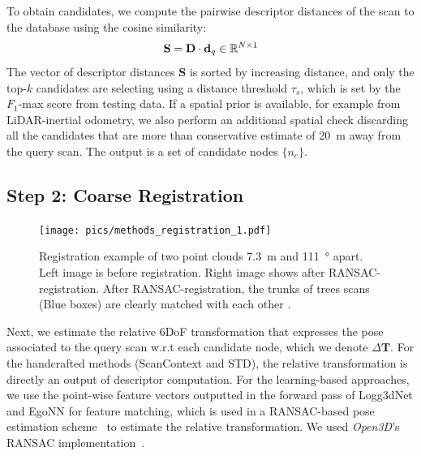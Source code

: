 To obtain candidates, we compute the pairwise descriptor distances of the scan to the database using the cosine similarity:
\begin{equation}
  \mathbf{S} = \mathbf{D} \cdot \mathbf{d}_{q} \in \mathbb{R}^{N \times 1}
\end{equation}
The vector of descriptor distances $\mathbf{S}$ is sorted by increasing distance, and only the top-$k$ candidates are selecting using a distance threshold $\tau_{s}$, which is set by the $F_1$-max score from testing data.
If a spatial prior is available, for example from LiDAR-inertial odometry, we also perform an additional spatial check discarding all the candidates that are more than conservative estimate of \SI{20}{\meter} away from the query scan. The output is a set of candidate nodes $\{ n_c\}$.


\subsection*{\textbf{Step 2: Coarse Registration}}
\label{subsubsec:coarse-registration}
\begin{figure}[htbp]
  \centering
  \texttt{[image: pics/methods\_registration\_1.pdf]}
  \caption{Registration example of two point clouds \SI{7.3}{\meter} and \SI{111}{\degree} apart. Left image is before registration. Right image shows after RANSAC-registration. After RANSAC-registration, the trunks of trees scans (Blue boxes) are clearly matched with each other . }
  \label{fig:registration_example}
\end{figure}
Next, we estimate the relative 6DoF transformation that expresses the pose associated to the query scan w.r.t each candidate node, which we denote $\Delta \mathbf{T}$. For the handcrafted methods (ScanContext and STD), the relative transformation is directly an output of descriptor computation. For the learning-based approaches, we use the point-wise feature vectors outputted in the forward pass of Logg3dNet and EgoNN for feature matching, which is used in a RANSAC-based pose estimation scheme~\cite{fischler1981ransac} to estimate the relative transformation. We used \emph{Open3D}'s RANSAC implementation~\cite{zhou2018}.  

